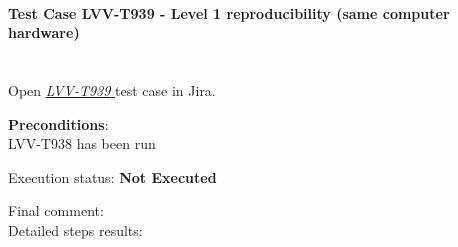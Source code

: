 \documentclass[DM,lsstdraft,STR,toc]{lsstdoc}
\begin{document}
\paragraph{Test Case LVV-T939 - Level 1 reproducibility (same computer hardware)
 }\mbox{}\\

Open  \href{https://jira.lsstcorp.org/secure/Tests.jspa#/testCase/LVV-T939}{\textit{ LVV-T939 } }
test case in Jira.



\textbf{ Preconditions}:\\
LVV-T938 has been run


Execution status: {\bf Not Executed }

Final comment:\\


Detailed steps results:
\end{document}

